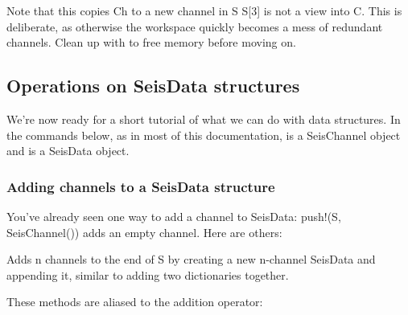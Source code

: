 \documentclass[letterpaper,11pt,english]{sphinxmanual}
\begin{document}
\begin{fulllineitems}
\end{fulllineitems}


Note that this copies Ch to a new channel in S \textendash{} S{[}3{]} is not a view into C.
This is deliberate, as otherwise the workspace quickly becomes a mess of
redundant channels. Clean up with  to free memory before moving on.


\subsection{Operations on SeisData structures}
\label{\detokenize{src/working_with_data:operations-on-seisdata-structures}}
We’re now ready for a short tutorial of what we can do with data structures.
In the commands below, as in most of this documentation,  is a
SeisChannel object and  is a SeisData object.


\subsubsection{Adding channels to a SeisData structure}
\label{\detokenize{src/working_with_data:adding-channels-to-a-seisdata-structure}}
You’ve already seen one way to add a channel to SeisData: push!(S, SeisChannel())
adds an empty channel. Here are others:


\begin{fulllineitems}
\end{fulllineitems}


Adds n channels to the end of S by creating a new n-channel SeisData and
appending it, similar to adding two dictionaries together.

These methods are aliased to the addition operator:

\begin{sphinxVerbatim}[commandchars=\\\{\}]
        
      
   
       
      \PYG{p}{[}    \PYG{p}{]}
\end{sphinxVerbatim}
\end{document}
